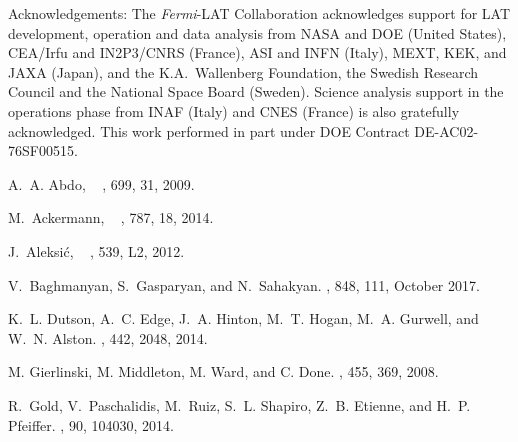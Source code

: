\documentclass{iau}
\begin{document}
Acknowledgements: The \textit{Fermi}-LAT Collaboration acknowledges support for LAT development, operation and data analysis from NASA and DOE (United States), CEA/Irfu and IN2P3/CNRS (France), ASI and INFN (Italy), MEXT, KEK, and JAXA (Japan), and the K.A.~Wallenberg Foundation, the Swedish Research Council and the National Space Board (Sweden). Science analysis support in the operations phase from INAF (Italy) and CNES (France) is also gratefully acknowledged. This work performed in part under DOE Contract DE-AC02-76SF00515.


%
%

\begin{thebibliography}{}

{A.~A. Abdo, \etal\ }
\newblock {\em \apj}, 699, 31, 2009.

M.~{Ackermann}, \etal\
\newblock {\em \apj}, 787, 18, 2014.

J.~{Aleksi{\'c}}, \etal\
\newblock {\em \aap}, 539, L2, 2012.

V.~{Baghmanyan}, S.~{Gasparyan}, and N.~{Sahakyan}.
\newblock {\em \apj}, 848, 111, October 2017.

K.~L. {Dutson}, A.~C. {Edge}, J.~A. {Hinton}, M.~T. {Hogan}, M.~A. {Gurwell},
  and W.~N. {Alston}.
\newblock {\em \mnras}, 442, 2048, 2014.

M. Gierlinski, M. Middleton, M. Ward, and C. Done.
\newblock {\em Nature}, 455, 369, 2008.

R.~{Gold}, V.~{Paschalidis}, M.~{Ruiz}, S.~L. {Shapiro}, Z.~B. {Etienne}, and
  H.~P. {Pfeiffer}.
\newblock {\em \prd}, 90, 104030, 2014.


\end{thebibliography}
\end{document}
